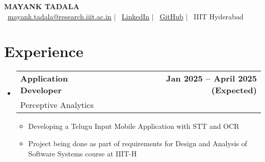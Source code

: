 \documentclass[a4paper,10pt]{article}
\makeatletter
\newcommand{\resumeItem}[1]{\item[\textcolor{bulletcolor}{\textbullet}] \small{#1}}
\newcommand{\resumeSubheading}[4]{
  \vspace{-2pt}\item
    \begin{tabular*}{0.97\textwidth}[t]{l@{\extracolsep{\fill}}r}
      \textbf{#1} & \textbf{\small #2} \\
      {\small #3} & {\small #4} \\
    \end{tabular*}\vspace{-7pt}
}
\makeatother
\begin{document}
\begin{center}
    \textbf{\Huge MAYANK TADALA} \\
    \vspace{1mm}
    \small
    \faEnvelope\ \href{mailto:mayank.tadala@research.iiit.ac.in}{mayank.tadala@research.iiit.ac.in} $|$
    \faLinkedin\ \href{https://www.linkedin.com/in/mayank-ts-92b9031b6/}{LinkedIn} $|$
    \faGithub\ \href{https://github.com/mayank3135432}{GitHub} $|$
    \faMapMarker\ IIIT Hyderabad
\end{center}

\section{Experience}
\begin{itemize}[leftmargin=0.15in, label={}]
    \resumeSubheading
        {Application Developer}{Jan 2025 -- April 2025 (Expected)}
        {Perceptive Analytics}{}
        \begin{itemize}[leftmargin=0.15in]
            \resumeItem{Developing a Telugu Input Mobile Application with STT and OCR}
            \resumeItem{Project being done as part of requirements for Design and Analysis of Software Systems course at IIIT-H}
        \end{itemize}
\end{itemize}

\end{document}
